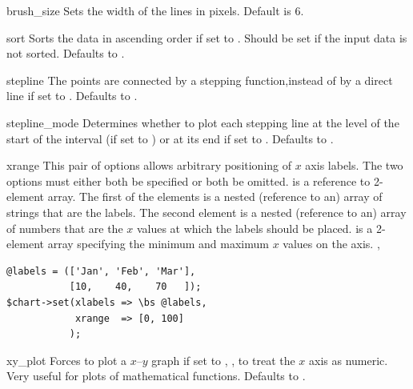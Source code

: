 \constructorblurb{\thisname}

\begin{AttrDecl}{brush\_size}
Sets the width of the lines in pixels. Default is 6.
\end{AttrDecl}

\begin{AttrDecl}{sort}
Sorts the data in ascending order if set to . Should be
set if the input data is not sorted. Defaults to .
\end{AttrDecl}

\begin{AttrDecl}{stepline}
The points are connected by a stepping function,instead of by a direct
line if set to . Defaults to .
\end{AttrDecl}

\begin{AttrDecl}{stepline\_mode}
Determines whether to plot each stepping line at the level of the
start of the interval (if set to ) or at its end if set
to . Defaults to .
\end{AttrDecl}

\begin{AttrDecl}{xrange}
This pair of options allows arbitrary positioning of $x$ axis labels.
The two options must either both be specified or both be omitted.
 is a reference to 2-element array. The first of the
elements is a nested (reference to an) array of strings that are the
labels. The second element is a nested (reference to an) array of
numbers that are the $x$ values at which the labels should be placed.
 is a 2-element array specifying the minimum and maximum
$x$ values on the axis. \Eg,
\begin{verbatim}
@labels = (['Jan', 'Feb', 'Mar'],
           [10,    40,    70   ]);
$chart->set(xlabels => \bs @labels,
            xrange  => [0, 100]
           );
\end{verbatim}
\end{AttrDecl}

\begin{AttrDecl}{xy\_plot}
Forces \thisclass to plot a $x$--$y$ graph if set to ,
\ie, to treat the $x$ axis as numeric. Very useful for plots of
mathematical functions. Defaults to .
\end{AttrDecl}

